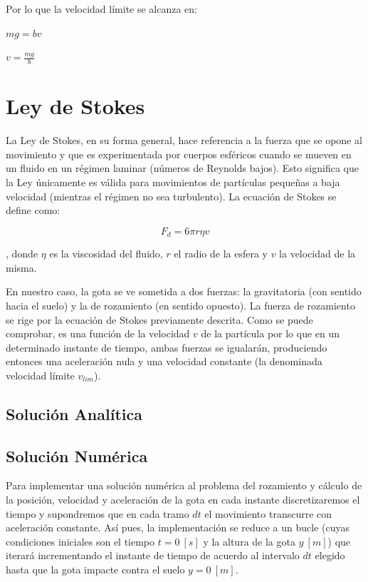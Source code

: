 \documentclass[journal]{IEEEtran}
\begin{document}
Por lo que la velocidad límite se alcanza en:

$mg = bv$

$v = \displaystyle\frac{mg}{b}$

\section{Ley de Stokes}

La Ley de Stokes, en su forma general, hace referencia a la fuerza que se opone al movimiento y que es experimentada por cuerpos esféricos cuando se mueven en un fluido en un régimen laminar (números de Reynolds bajos). Esto significa que la Ley únicamente es válida para movimientos de partículas pequeñas a baja velocidad (mientras el régimen no sea turbulento). La ecuación de Stokes se define como:

\begin{equation}
  F_d = 6 \pi r \eta v
\end{equation}

, donde $\eta$ es la viscosidad del fluido, $r$ el radio de la esfera y $v$ la velocidad de la misma.

En nuestro caso, la gota se ve sometida a dos fuerzas: la gravitatoria (con sentido hacia el suelo) y la de rozamiento (en sentido opuesto). La fuerza de rozamiento se rige por la ecuación de Stokes previamente descrita. Como se puede comprobar, es una función de la velocidad $v$ de la partícula por lo que en un determinado instante de tiempo, ambas fuerzas se igualarán, produciendo entonces una aceleración nula y una velocidad constante (la denominada velocidad límite
$v_{lim}$).

\subsection{Solución Analítica}

\subsection{Solución Numérica}

Para implementar una solución numérica al problema del rozamiento y cálculo de la posición, velocidad y aceleración de la gota en cada instante discretizaremos el tiempo y supondremos que en cada tramo $dt$ el movimiento transcurre con aceleración constante. Así pues, la implementación se reduce a un bucle (cuyas condiciones iniciales son el tiempo $t = 0~[s]$ y la altura de la gota $y~[m]$) que iterará incrementando el instante de tiempo de acuerdo al intervalo $dt$ elegido hasta que la
gota impacte contra el suelo $y = 0~[m]$.
\end{document}

